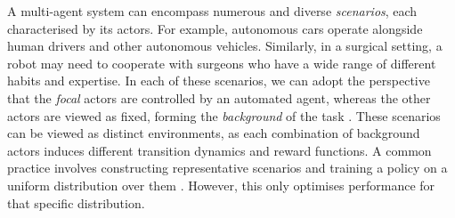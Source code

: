 
A multi-agent system can encompass numerous and diverse \emph{scenarios}, each characterised by its actors. For example, autonomous cars operate alongside human drivers and other autonomous vehicles. Similarly, in a surgical setting, a robot may need to cooperate with surgeons who have a wide range of different habits and expertise. In each of these scenarios, we can adopt the perspective that the \emph{focal} actors are controlled by an automated agent, whereas the other actors are viewed as fixed, forming the \emph{background} of the task \citep{leibo_scalable_evaluation_multi_2021, agapiou_melting_pot_2_2023}. These scenarios can be viewed as distinct environments, as each combination of background actors induces different transition dynamics and reward functions. A common practice involves constructing representative scenarios and training a policy on a uniform distribution over them \citep{strouse_collaboration_with_humans_2021,lupu_trajectory_diversity_zero_2021}. However, this only optimises performance for that specific distribution.

